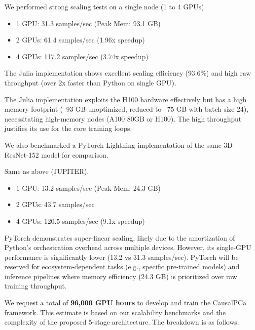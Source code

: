 \documentclass[new,showhints]{nhrproposal}
\begin{document}
\BenchmarkData
We performed strong scaling tests on a single node (1 to 4 GPUs).
\begin{itemize}
    \item 1 GPU: 31.3 samples/sec (Peak Mem: 93.1 GB)
    \item 2 GPUs: 61.4 samples/sec (1.96x speedup)
    \item 4 GPUs: 117.2 samples/sec (3.74x speedup)
\end{itemize}
The Julia implementation shows excellent scaling efficiency (93.6\%) and high raw throughput (over 2x faster than Python on single GPU).

\BenchmarkDiscussion
The Julia implementation exploits the H100 hardware effectively but has a high memory footprint (~93 GB unoptimized, reduced to ~75 GB with batch size 24), necessitating high-memory nodes (A100 80GB or H100). The high throughput justifies its use for the core training loops.

\BenchmarkDescription
We also benchmarked a PyTorch Lightning implementation of the same 3D ResNet-152 model for comparison.

\BenchmarkSystem
Same as above (JUPITER).

\BenchmarkData
\begin{itemize}
    \item 1 GPU: 13.2 samples/sec (Peak Mem: 24.3 GB)
    \item 2 GPUs: 43.7 samples/sec
    \item 4 GPUs: 120.5 samples/sec (9.1x speedup)
\end{itemize}

\BenchmarkDiscussion
PyTorch demonstrates super-linear scaling, likely due to the amortization of Python's orchestration overhead across multiple devices. However, its single-GPU performance is significantly lower (13.2 vs 31.3 samples/sec). PyTorch will be reserved for ecosystem-dependent tasks (e.g., specific pre-trained models) and inference pipelines where memory efficiency (24.3 GB) is prioritized over raw training throughput.


\ResourceJustification
We request a total of \textbf{96,000 GPU hours} to develop and train the CausalPCa framework. This estimate is based on our scalability benchmarks and the complexity of the proposed 5-stage architecture. The breakdown is as follows:
\end{document}
